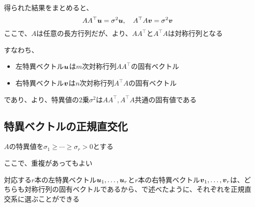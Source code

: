 \documentclass[../../../topic_linear-algebra]{subfiles}
\begin{document}
得られた結果をまとめると、
\begin{equation*}
  A A^\top \vb*{u} = \sigma^2 \vb*{u} , \quad A^\top A \vb*{v} = \sigma^2 \vb*{v}
\end{equation*}
ここで、$A$は任意の長方行列だが、より、$A A^\top$と$A^\top A$は対称行列となる

\br

すなわち、
\begin{itemize}
  \item 左特異ベクトル$\vb*{u}$は$m$次対称行列$A A^\top$の固有ベクトル
  \item 右特異ベクトル$\vb*{v}$は$n$次対称行列$A^\top A$の固有ベクトル
\end{itemize}
であり、より、特異値の2乗$\sigma^2$は$A A^\top, A^\top A$共通の固有値である

\subsection{特異ベクトルの正規直交化}

$A$の特異値を$\sigma_1 \geq \cdots \geq \sigma_r > 0$とする

ここで、重複があってもよい

\br

対応する$r$本の左特異ベクトル$\vb*{u}_1, \ldots, \vb*{u}_r$と$r$本の右特異ベクトル$\vb*{v}_1, \ldots, \vb*{v}_r$は、どちらも対称行列の固有ベクトルであるから、で述べたように、それぞれを正規直交系に選ぶことができる
\end{document}
